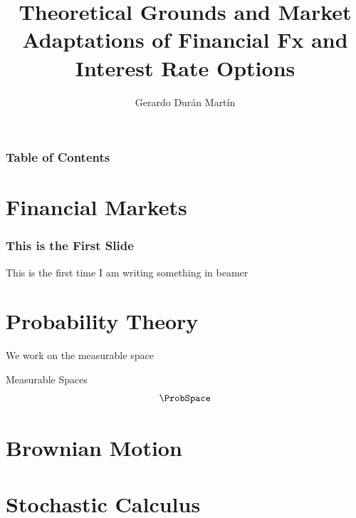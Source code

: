 \documentclass{beamer}
\title{Theoretical Grounds and Market Adaptations of Financial Fx and Interest Rate Options}
\author{Gerardo Dur\'an Mart\'in}
\institute{Universidad Marista}
\begin{document}
\frame{\titlepage}

\begin{frame}
	\frametitle{Table of Contents}
	\tableofcontents
\end{frame}

\section{Financial Markets}
\begin{frame}
	\frametitle{This is the First Slide}	
	This is the first time I am writing something in beamer
\end{frame}

\section{Probability Theory}

We work on the measurable space
\begin{block}{Measurable Spaces}
	\begin{equation}
		\ProbSpace
	\end{equation}
\end{block}

\section{Brownian Motion}
\section{Stochastic Calculus}
\end{document}
